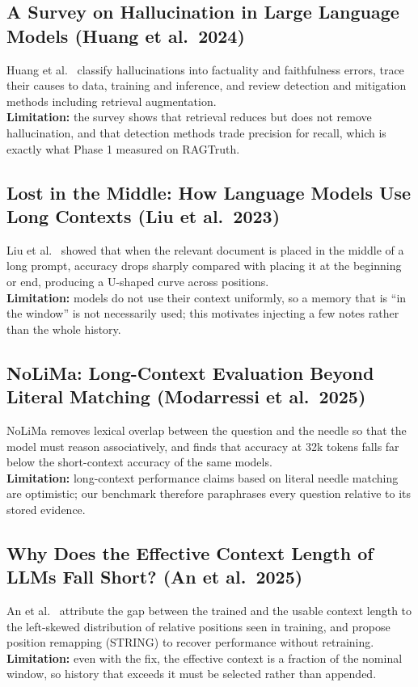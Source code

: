 \subsection{A Survey on Hallucination in Large Language Models (Huang et al.\ 2024)}
Huang et al.\ \cite{huang2024} classify hallucinations into factuality and faithfulness errors, trace their
causes to data, training and inference, and review detection and mitigation methods including retrieval
augmentation. \\
\textbf{Limitation:} the survey shows that retrieval reduces but does not remove hallucination, and that
detection methods trade precision for recall, which is exactly what Phase 1 measured on RAGTruth.

\subsection{Lost in the Middle: How Language Models Use Long Contexts (Liu et al.\ 2023)}
Liu et al.\ \cite{liu2023} showed that when the relevant document is placed in the middle of a long
prompt, accuracy drops sharply compared with placing it at the beginning or end, producing a U-shaped
curve across positions. \\
\textbf{Limitation:} models do not use their context uniformly, so a memory that is ``in the window'' is
not necessarily used; this motivates injecting a few notes rather than the whole history.

\subsection{NoLiMa: Long-Context Evaluation Beyond Literal Matching (Modarressi et al.\ 2025)}
NoLiMa \cite{nolima2025} removes lexical overlap between the question and the needle so that the model
must reason associatively, and finds that accuracy at 32k tokens falls far below the short-context
accuracy of the same models. \\
\textbf{Limitation:} long-context performance claims based on literal needle matching are optimistic; our
benchmark therefore paraphrases every question relative to its stored evidence.

\subsection{Why Does the Effective Context Length of LLMs Fall Short? (An et al.\ 2025)}
An et al.\ \cite{an2025} attribute the gap between the trained and the usable context length to the
left-skewed distribution of relative positions seen in training, and propose position remapping (STRING)
to recover performance without retraining. \\
\textbf{Limitation:} even with the fix, the effective context is a fraction of the nominal window, so
history that exceeds it must be selected rather than appended.

